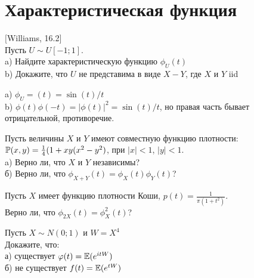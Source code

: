 \section{Характеристическая функция} 

\begin{problem}
$[$Williams, 16.2$]$ \\
Пусть $U\sim U[-1;1]$. \\
a) Найдите характеристическую функцию $\phi_{U}(t)$ \\
b) Докажите, что $U$ не представима в виде $X-Y$, где $X$ и $Y$
iid 
\end{problem} 
\begin{solution} 


a) $\phi_{U}=(t)=\sin(t)/t$ \\
b) $\phi(t)\phi(-t)=|\phi(t)|^{2}=\sin(t)/t$, но правая часть
бывает отрицательной, противоречие. 
\end{solution}

\begin{problem}
Пусть величины $X$ и $Y$ имеют совместную функцию плотности: \\
$\P(x,y)=\frac{1}{4}(1+xy(x^{2}-y^{2})$, при $|x|<1$, $|y|<1$. \\
a) Верно ли, что $X$ и $Y$ независимы? \\
б) Верно ли, что $\phi_{X+Y}(t)=\phi_{X}(t)\phi_{Y}(t)$? 
\end{problem} 
\begin{solution} 

\end{solution}

\begin{problem}
Пусть $X$ имеет функцию плотности Коши,
$p(t)=\frac{1}{\pi(1+t^{2})}$. \\
Верно ли, что $\phi_{2X}(t)=\phi_{X}^{2}(t)$? 
\end{problem} 
\begin{solution} 

\end{solution}

\begin{problem}
Пусть $X\sim N(0;1)$ и $W=X^{4}$ \\
Докажите, что: \\
а) существует $\varphi(t)=\E(e^{itW})$ \\
б) не существует $f(t)=\E(e^{tW})$ 
\end{problem} 
\begin{solution} 

\end{solution}

